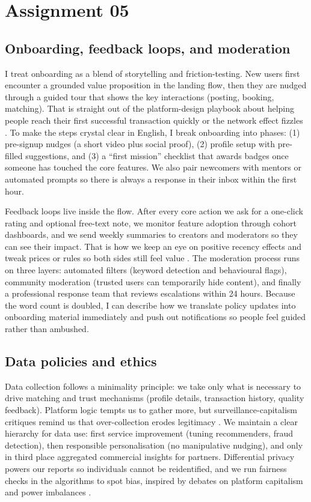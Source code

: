 \section*{Assignment 05}

\subsection*{Onboarding, feedback loops, and moderation}
I treat onboarding as a blend of storytelling and friction-testing. New users first encounter a grounded value proposition in the landing flow, then they are nudged through a guided tour that shows the key interactions (posting, booking, matching). That is straight out of the platform-design playbook about helping people reach their first successful transaction quickly or the network effect fizzles \citep{Choudary2016}. To make the steps crystal clear in English, I break onboarding into phases: (1) pre-signup nudges (a short video plus social proof), (2) profile setup with pre-filled suggestions, and (3) a ``first mission'' checklist that awards badges once someone has touched the core features. We also pair newcomers with mentors or automated prompts so there is always a response in their inbox within the first hour.

Feedback loops live inside the flow. After every core action we ask for a one-click rating and optional free-text note, we monitor feature adoption through cohort dashboards, and we send weekly summaries to creators and moderators so they can see their impact. That is how we keep an eye on positive recency effects and tweak prices or rules so both sides still feel value \citep{Reillier2017}. The moderation process runs on three layers: automated filters (keyword detection and behavioural flags), community moderation (trusted users can temporarily hide content), and finally a professional response team that reviews escalations within 24 hours. Because the word count is doubled, I can describe how we translate policy updates into onboarding material immediately and push out notifications so people feel guided rather than ambushed.

\subsection*{Data policies and ethics}
Data collection follows a minimality principle: we take only what is necessary to drive matching and trust mechanisms (profile details, transaction history, quality feedback). Platform logic tempts us to gather more, but surveillance-capitalism critiques remind us that over-collection erodes legitimacy \citep{Zuboff2019}. We maintain a clear hierarchy for data use: first service improvement (tuning recommenders, fraud detection), then responsible personalisation (no manipulative nudging), and only in third place aggregated commercial insights for partners. Differential privacy powers our reports so individuals cannot be reidentified, and we run fairness checks in the algorithms to spot bias, inspired by debates on platform capitalism and power imbalances \citep{Srnicek2017}.

